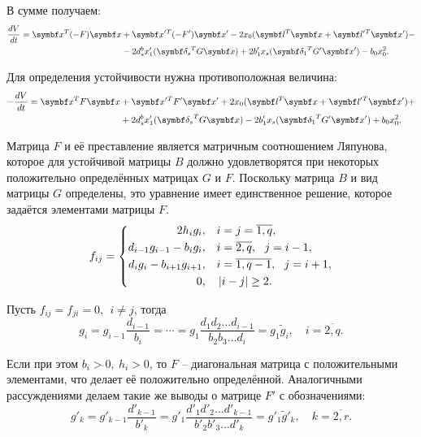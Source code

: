 В сумме получаем:
\begin{equation}
    \begin{split}
        \frac{dV}{dt} = \mb{x}^T (-F) \mb{x} &+ \mb{x'}{}^T (-F') \mb{x'} - 2 x_0(\mb{l}^T \mb{x} + \mb{l'}{}^T \mb{x'}) - \\
        &- 2 d^b_s x'_1 (\mb{\delta_s}^T G \mb{x}) + 2 b'_1 x_s (\mb{\delta_1}^T G' \mb{x'}) - b_0 x_0^2.
    \end{split}
\end{equation}

Для определения устойчивости нужна противоположная величина:
\begin{equation} \label{full_diff_split}
    \begin{split}
        -\frac{dV}{dt} = \mb{x}^T F \mb{x} &+ \mb{x'}{}^T F' \mb{x'} + 2 x_0(\mb{l}^T \mb{x} + \mb{l'}{}^T \mb{x'}) + \\
        & + 2 d^b_s x'_1 (\mb{\delta_s}^T G \mb{x}) - 2 b'_1 x_s (\mb{\delta_1}^T G' \mb{x'}) + b_0 x_0^2.
    \end{split}
\end{equation}

Матрица \(F\) и её преставление является матричным соотношением Ляпунова, которое для устойчивой матрицы \(B\) должно удовлетворятся при некоторых положительно определённых матрицах \(G\) и \(F\). Поскольку матрица \(B\) и вид матрицы \(G\) определены, это уравнение имеет единственное решение, которое задаётся элементами матрицы \(F\).
\begin{equation*}
    f_{ij} = \left\{ \begin{split}
        2h_i g_i, \quad & i=j=\overline{1,q}, \\
        d_{i-1} g_{i-1} - b_i g_i, \quad & i=\overline{2,q}, ~~ j=i-1, \\
        d_i g_i - b_{i+1} g_{i+1}, \quad & i=\overline{1,q-1}, ~~ j=i+1, \\
        0, \quad & \left\vert i-j \right\vert \geq 2.
    \end{split} \right.
\end{equation*}

Пусть \(f_{ij} = f_{ji} = 0, ~~ i \neq j\), тогда
\begin{equation}
    g_i = g_{i-1} \frac{d_{i-1}}{b_i} = \cdots = g_1 \frac{d_1 d_2 \dots d_{i-1}}{b_2 b_3 \dots d_i} = g_1 \widetilde{g}_i, \quad i=\overline{2,q}.
\end{equation}

Если при этом \( b_i > 0, ~ h_i > 0 \), то \(F\) -- диагональная матрица с положительными элементами, что делает её положительно определённой. Аналогичными рассуждениями делаем такие же выводы о матрице \(F'\) с обозначениями:
\begin{equation}
    g'_k = g'_{k-1} \frac{d'_{k-1}}{b'_k} = g'_1 \frac{d'_1 d'_2 \dots d'_{k-1}}{b'_2 b'_3 \dots d'_k} = g'_1 \widetilde{g}'_k, \quad k=\overline{2,r}.
\end{equation}

